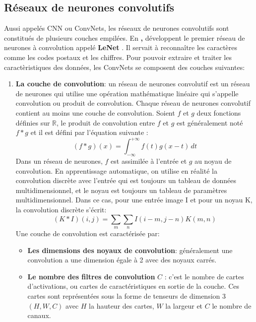    \subsection{Réseaux de neurones convolutifs}
    Aussi appelés CNN ou ConvNets, les réseaux de neurones convolutifs sont constitués de plusieurs couches empilées. En \textbf{\citeyear{lenet}, }   développent le premier réseau de neurones à convolution appelé \textbf{LeNet} \cite{lenet}. Il servait à reconnaître les caractères comme les codes postaux et les chiffres.
    Pour pouvoir extraire et traiter les caractèristiques des données, les ConvNets se composent des couches suivantes:
        \begin{enumerate}
            \item \textbf{La couche de convolution}:
            un réseau de neurones convolutif est un réseau de neurones qui utilise une opération mathématique linéaire qui s’appelle convolution ou produit de convolution. Chaque réseau de neurones convolutif contient au moins une couche de convolution. Soient $f$ et $g$ deux fonctions définies sur $\mathbb{R}$, le produit de convolution entre $f$ et $g$ est généralement noté $f*g$  et il est défini par l’équation suivante :
                \begin{equation}
                    (f*g)(x) = \int_{-\infty}^{+\infty} f(t)g(x-t)\,dt 
                \end{equation}
            Dans un réseau de neurones, $f$ est assimilée à l'entrée et $g$ au noyau de convolution. En apprentissage automatique, on utilise en réalité la convolution discrète avec  l'entrée qui est toujours un tableau de données multidimensionnel, et le noyau est toujours un tableau de paramètres multidimensionnel. Dans ce cas, pour une entrée image I et pour un noyau K, la convolution discrète s’écrit:
                \begin{equation}
                    (K*I)(i, j) = \sum_{m}\sum_{n}I(i-m, j-n)K(m, n)
                \end{equation}
            Une couche de convolution est caractérisée par:
                \begin{itemize}
                    \item \textbf{Les dimensions des noyaux de convolution}: généralement une convolution a une
                    dimension égale à 2 avec des noyaux carrés.
                    \item \textbf{Le nombre des filtres de convolution} $C$ : c’est le nombre de cartes d’activations, ou cartes de caractéristiques en sortie de la couche. Ces cartes sont représentées sous la forme de tenseurs de dimension 3 $(H, W, C)$ avec $H$ la hauteur des cartes, $W$ la largeur et $C$ le nombre de canaux.

\end{itemize}
\end{enumerate}
